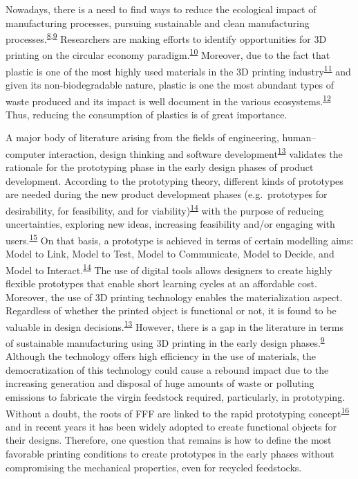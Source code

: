 \documentclass[
  12pt]{article}
\begin{document}
Nowadays, there is a need to find ways to reduce the ecological impact of manufacturing processes, pursuing sustainable and clean manufacturing processes.\textsuperscript{\protect\hyperlink{ref-Niaki2019}{8},\protect\hyperlink{ref-Peng2018}{9}}
Researchers are making efforts to identify opportunities for 3D printing on the circular economy paradigm.\textsuperscript{\protect\hyperlink{ref-Despeisse2016}{10}}
Moreover, due to the fact that plastic is one of the most highly used materials in the 3D printing industry\textsuperscript{\protect\hyperlink{ref-GonzalezHenriquez2019}{11}} and given its non-biodegradable nature, plastic is one the most abundant types of waste produced and its impact is well document in the various ecosystems.\textsuperscript{\protect\hyperlink{ref-Ryberg2019}{12}}
Thus, reducing the consumption of plastics is of great importance.

A major body of literature arising from the fields of engineering, human--computer interaction, design thinking and software development\textsuperscript{\protect\hyperlink{ref-Elverum2016}{13}} validates the rationale for the prototyping phase in the early design phases of product development.
According to the prototyping theory, different kinds of prototypes are needed during the new product development phases (e.g.~prototypes for desirability, for feasibility, and for viability)\textsuperscript{\protect\hyperlink{ref-Menold2017}{14}} with the purpose of reducing uncertainties, exploring new ideas, increasing feasibility and/or engaging with users.\textsuperscript{\protect\hyperlink{ref-Hansen2020}{15}}
On that basis, a prototype is achieved in terms of certain modelling aims: Model to Link, Model to Test, Model to Communicate, Model to Decide, and Model to Interact.\textsuperscript{\protect\hyperlink{ref-Menold2017}{14}}
The use of digital tools allows designers to create highly flexible prototypes that enable short learning cycles at an affordable cost.
Moreover, the use of 3D printing technology enables the materialization aspect.
Regardless of whether the printed object is functional or not, it is found to be valuable in design decisions.\textsuperscript{\protect\hyperlink{ref-Elverum2016}{13}}
However, there is a gap in the literature in terms of sustainable manufacturing using 3D printing in the early design phases.\textsuperscript{\protect\hyperlink{ref-Peng2018}{9}}
Although the technology offers high efficiency in the use of materials, the democratization of this technology could cause a rebound impact due to the increasing generation and disposal of huge amounts of waste or polluting emissions to fabricate the virgin feedstock required, particularly, in prototyping.
Without a doubt, the roots of FFF are linked to the rapid prototyping concept\textsuperscript{\protect\hyperlink{ref-Campbell2012}{16}} and in recent years it has been widely adopted to create functional objects for their designs. Therefore, one question that remains is how to define the most favorable printing conditions to create prototypes in the early phases without compromising the mechanical properties, even for recycled feedstocks.
\end{document}
